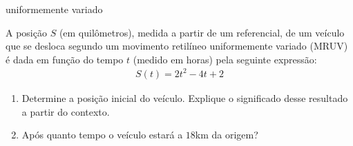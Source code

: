 \begin{task}{ uniformemente variado}
\label{\detokenize{AF106-2:atividade-uniformemente-variado}}\label{\detokenize{AF106-2:ativ-funcoes-uniformemente-variado}}

A posição \(S\) (em quilômetros), medida a partir de um referencial, de um veículo que se desloca segundo um movimento retilíneo uniformemente variado (MRUV) é dada em função do tempo \(t\) (medido em horas) pela seguinte expressão:
\begin{equation*}
\begin{split}S(t)=2t^2-4t+2\end{split}
\end{equation*}\begin{enumerate}
\item {} 
Determine a posição inicial do veículo. Explique o significado desse resultado a partir do contexto.

\item {} 
Após quanto tempo o veículo estará a $18$km da origem?

\end{enumerate}
\end{task}


